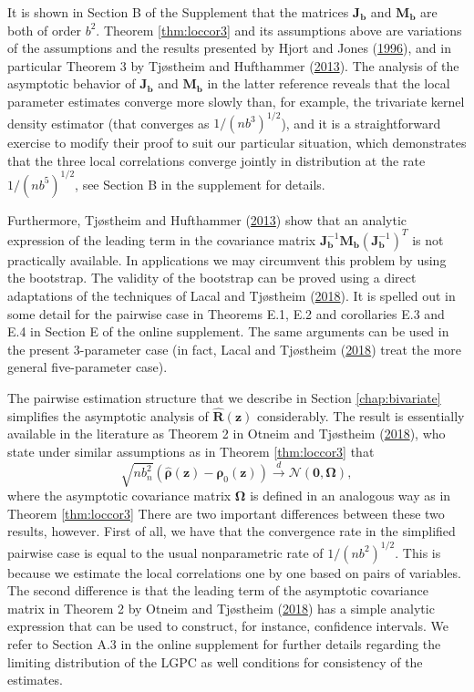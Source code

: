 \documentclass[
  12pt,
  letterpaper]{article}
\newcommand{\z}{\bm{z}}
\newcommand{\hR}{\widehat{\bm{R}}}
\newcommand{\frho}{\bm{\rho}}
\newcommand{\hfrho}{\widehat{\bm{\rho}}}
\newcommand{\hh}{\bm{b}}
\newcommand{\fOmega}{\bm{\Omega}}
\newcommand{\Jb}{\bm{J}_{\hh}}
\newcommand{\Mb}{\bm{M}_{\hh}}
\theoremstyle{definition}
\theoremstyle{definition}
\theoremstyle{definition}
\theoremstyle{remark}
\begin{document}
It is shown in Section B of the Supplement that the matrices \(\Jb\) and \(\Mb\) are both of order \(b^2\). Theorem \ref{thm:loccor3} and its assumptions above are variations of the assumptions and the results presented by Hjort and Jones (\protect\hyperlink{ref-hjort1996locally}{1996}), and in particular Theorem 3 by Tjøstheim and Hufthammer (\protect\hyperlink{ref-tjostheim2013local}{2013}). The analysis of the asymptotic behavior of \(\Jb\) and \(\Mb\) in the latter reference reveals that the local parameter estimates converge more slowly than, for example, the trivariate kernel density estimator (that converges as \(1/(nb^3)^{1/2}\)), and it is a straightforward exercise to modify their proof to suit our particular situation, which demonstrates that the three local correlations converge jointly in distribution at the rate \(1/(nb^5)^{1/2}\), see Section B in the supplement for details.

Furthermore, Tjøstheim and Hufthammer (\protect\hyperlink{ref-tjostheim2013local}{2013}) show that an analytic expression of the leading term in the covariance matrix \(\Jb^{-1}\Mb(\Jb^{-1})^T\) is not practically available. In applications we may circumvent this problem by using the bootstrap. The validity of the bootstrap can be proved using a direct adaptations of the techniques of Lacal and Tjøstheim (\protect\hyperlink{ref-lacal2018estimating}{2018}). It is spelled out in some detail for the pairwise case in Theorems E.1, E.2 and corollaries E.3 and E.4 in Section E of the online supplement. The same arguments can be used in the present 3-parameter case (in fact, Lacal and Tjøstheim (\protect\hyperlink{ref-lacal2018estimating}{2018}) treat the more general five-parameter case).

The pairwise estimation structure that we describe in Section \ref{chap:bivariate} simplifies the asymptotic analysis of \(\hR(\z)\) considerably. The result is essentially available in the literature as Theorem 2 in Otneim and Tjøstheim (\protect\hyperlink{ref-otneim2017conditional}{2018}), who state under similar assumptions as in Theorem \ref{thm:loccor3} that
\begin{equation}
\sqrt{nb_n^2}\left(\hfrho(\z) - \frho_0(\z)\right) \stackrel{d}{\rightarrow} \mathcal{N}(\bm{0}, \fOmega),
\label{eq:ot2018}
\end{equation}
where the asymptotic covariance matrix \(\fOmega\) is defined in an analogous way as in Theorem \ref{thm:loccor3} There are two important differences between these two results, however. First of all, we have that the convergence rate in the simplified pairwise case is equal to the usual nonparametric rate of \(1/(nb^2)^{1/2}\). This is because we estimate the local correlations one by one based on pairs of variables. The second difference is that the leading term of the asymptotic covariance matrix in Theorem 2 by Otneim and Tjøstheim (\protect\hyperlink{ref-otneim2017conditional}{2018}) has a simple analytic expression that can be used to construct, for instance, confidence intervals. We refer to Section A.3 in the online supplement for further details regarding the limiting distribution of the LGPC as well conditions for consistency of the estimates.
\end{document}
